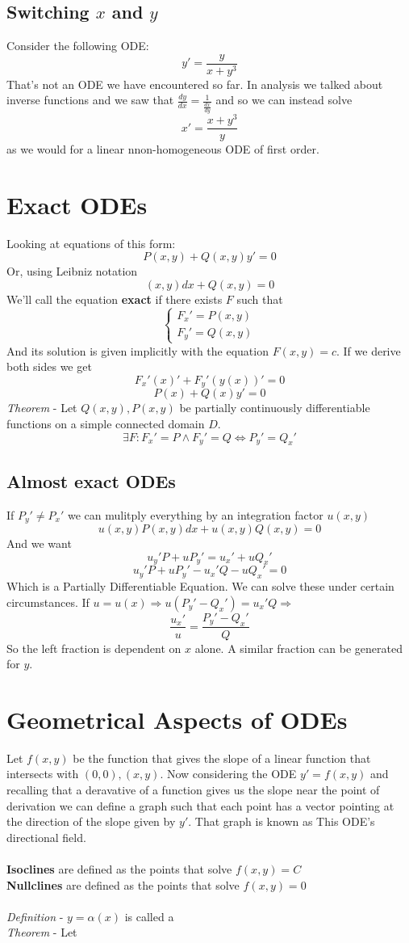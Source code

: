 \documentclass{article}
\begin{document}
	\subsection{Switching $x$ and $y$}
	Consider the following ODE:
	\[
	y'=\frac y{x+y^3}
	\]
	That's not an ODE we have encountered so far. In analysis we talked about inverse functions and we saw that $\frac{dy}{dx} = \frac{1}{\frac{dx}{dy}}$ and so we can instead solve
	\[
		x' = \frac{x+y^3}{y}
	\]
as we would for a linear nnon-homogeneous ODE of first order.
\newpage
\section{Exact ODEs}
Looking at equations of this form:
\[
	P(x,y)+Q(x,y)y'=0
\]
Or, using Leibniz notation
\[
	(x,y)dx+Q(x,y) = 0
\]
We'll call the equation \textbf{exact} if there exists $F$ such that
\begin{equation*}
    \begin{cases}
    F_x'=P(x,y) \\
    F_y'=Q(x,y)
    \end{cases}
\end{equation*}
And its solution is given implicitly with the equation $F(x,y)=c$. If we derive both sides we get
\[
	F_x'(x)'+F_y'(y(x))'=0
\]
\[
	P(x)+Q(x)y'=0
\]
\emph{Theorem} - Let $Q(x,y),P(x,y)$ be partially continuously differentiable functions on a simple connected domain $D$.
$$\exists F: F_x'=P\land F_y'=Q \iff P_y'=Q_x'$$
\subsection{Almost exact ODEs}
If $P_y'\ne P_x'$ we can mulitply everything by an integration factor $u(x,y)$
\[
	u(x,y)P(x,y)dx+u(x,y)Q(x,y) = 0
\]
And we want
\[
	u_y'P+uP_y' = u_x'+uQ_x'
\]
\[
	u_y'P+uP_y' - u_x'Q - uQ_x' = 0
\]
Which is a Partially Differentiable Equation. We can solve these under certain circumstances. If $u=u(x) \Rightarrow u(P_y' - Q_x') = u_x'Q \Rightarrow$
\[
	\frac{u_x'}{u}=\frac{P_y'-Q_x'}{Q}
\]
So the left fraction is dependent on $x$ alone. A similar fraction can be generated for $y$.
\newpage
\section{Geometrical Aspects of ODEs}
Let $f(x,y)$ be the function that gives the slope of a linear function that intersects with $(0,0),(x,y)$. Now considering the ODE $y'=f(x,y)$ and recalling that a deravative of a function gives us the slope near the point of derivation we can define a graph such that each point has a vector pointing at the direction of the slope given by $y'$. That graph is known as This ODE's directional field.
\\\\
\textbf{Isoclines} are defined as the points that solve $f(x,y)=C$\\
\textbf{Nullclines} are defined as the points that solve $f(x,y)=0$
\\\\
\emph{Definition} - $y=\alpha(x)$ is called a 
\\
\emph{Theorem} -  Let
\end{document}
